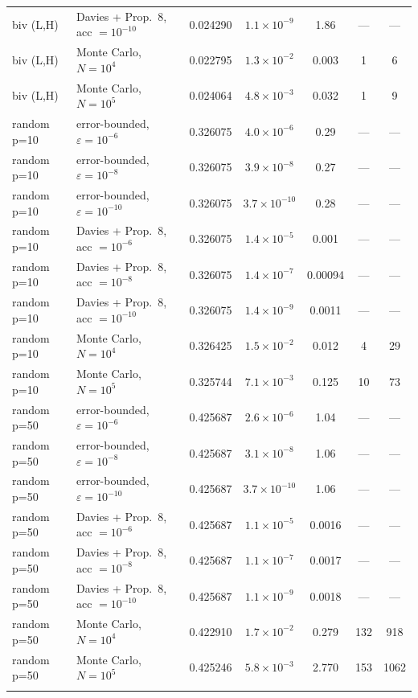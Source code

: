 \begin{table}[t]
\begin{tabular*}{\textwidth}{@{\extracolsep\fill}llccccc@{}}
biv (L,H) & Davies + Prop.~8, acc $=10^{-10}$ & 0.024290 & $1.1\times10^{-9}$ & 1.86 & --- & --- \\
biv (L,H) & Monte Carlo, $N=10^{4}$ & 0.022795 & $1.3\times10^{-2}$ & 0.003 & 1 & 6 \\
biv (L,H) & Monte Carlo, $N=10^{5}$ & 0.024064 & $4.8\times10^{-3}$ & 0.032 & 1 & 9 \\
\midrule
random p=10 & error-bounded, $\varepsilon=10^{-6}$ & 0.326075 & $4.0\times10^{-6}$ & 0.29 & --- & --- \\
random p=10 & error-bounded, $\varepsilon=10^{-8}$ & 0.326075 & $3.9\times10^{-8}$ & 0.27 & --- & --- \\
random p=10 & error-bounded, $\varepsilon=10^{-10}$ & 0.326075 & $3.7\times10^{-10}$ & 0.28 & --- & --- \\
random p=10 & Davies + Prop.~8, acc $=10^{-6}$ & 0.326075 & $1.4\times10^{-5}$ & 0.001 & --- & --- \\
random p=10 & Davies + Prop.~8, acc $=10^{-8}$ & 0.326075 & $1.4\times10^{-7}$ & 0.00094 & --- & --- \\
random p=10 & Davies + Prop.~8, acc $=10^{-10}$ & 0.326075 & $1.4\times10^{-9}$ & 0.0011 & --- & --- \\
random p=10 & Monte Carlo, $N=10^{4}$ & 0.326425 & $1.5\times10^{-2}$ & 0.012 & 4 & 29 \\
random p=10 & Monte Carlo, $N=10^{5}$ & 0.325744 & $7.1\times10^{-3}$ & 0.125 & 10 & 73 \\
\midrule
random p=50 & error-bounded, $\varepsilon=10^{-6}$ & 0.425687 & $2.6\times10^{-6}$ & 1.04 & --- & --- \\
random p=50 & error-bounded, $\varepsilon=10^{-8}$ & 0.425687 & $3.1\times10^{-8}$ & 1.06 & --- & --- \\
random p=50 & error-bounded, $\varepsilon=10^{-10}$ & 0.425687 & $3.7\times10^{-10}$ & 1.06 & --- & --- \\
random p=50 & Davies + Prop.~8, acc $=10^{-6}$ & 0.425687 & $1.1\times10^{-5}$ & 0.0016 & --- & --- \\
random p=50 & Davies + Prop.~8, acc $=10^{-8}$ & 0.425687 & $1.1\times10^{-7}$ & 0.0017 & --- & --- \\
random p=50 & Davies + Prop.~8, acc $=10^{-10}$ & 0.425687 & $1.1\times10^{-9}$ & 0.0018 & --- & --- \\
random p=50 & Monte Carlo, $N=10^{4}$ & 0.422910 & $1.7\times10^{-2}$ & 0.279 & 132 & 918 \\
random p=50 & Monte Carlo, $N=10^{5}$ & 0.425246 & $5.8\times10^{-3}$ & 2.770 & 153 & 1062 \\
\botrule
\end{tabular*}
\end{table}

